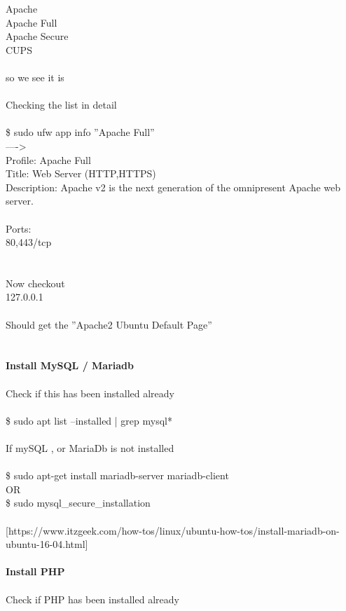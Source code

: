 \documentclass[10pt,a4paper]{article}
\begin{document}
{{{{{{{{{{{{{{{{{{  Apache\\
  Apache Full\\
  Apache Secure\\
  CUPS\\
\\
so we see it is\\
\\
Checking the list in detail\\
\\
\$ sudo ufw app info ''Apache Full'' \\
---->\\
Profile: Apache Full\\
Title: Web Server (HTTP,HTTPS)\\
Description: Apache v2 is the next generation of the omnipresent Apache web\\
server.\\
\\
Ports:\\
  80,443/tcp\\
\\
\\
Now checkout\\
127.0.0.1\\
\\
Should get the ''Apache2 Ubuntu Default Page''\\
\\
\\
\textbf{Install MySQL / Mariadb}}{\large \\
\\
Check if this has been installed already\\
\\
\$ sudo apt list --installed | grep  mysql*\\
\\
If mySQL , or MariaDb is not installed\\
\\
\$ sudo apt-get install mariadb-server mariadb-client\\
OR\\
\$ sudo mysql\_secure\_installation\\
\\
[https://www.itzgeek.com/how-tos/linux/ubuntu-how-tos/install-mariadb-on-ubuntu-16-04.html}{\large ]\\
\\
\textbf{Install PHP}}{\large \\
\\
Check if PHP has been installed already\\
}}}}}}}}}}}}}}}}}}
\end{document}
